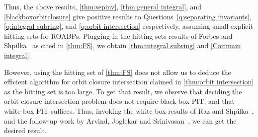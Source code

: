 \documentclass[letterpaper,11pt]{article}
\numberwithin{equation}{section}
\theoremstyle{plain}
\theoremstyle{remark}
\begin{document}
Thus, the above results, \autoref{thm:sepinv}, \autoref{thm:general integral}, and \autoref{blackboxorbitclosure} give positive results to Questions~\ref{q:separating invariants}, \ref{q:integral subring}, and \ref{q:orbit intersection} respectively, assuming small explicit hitting sets for ROABPs.  Plugging in the hitting sets results of Forbes and Shpilka~\cite{ForbesShpilka12a} as cited in \autoref{thm:FS}, we obtain \autoref{thm:integral subring} and \autoref{Cor:main integral}.

However, using the hitting set of \autoref{thm:FS} does not allow us to deduce the efficient algorithm for orbit closure intersection claimed in \autoref{thm:orbit intersection} as the hitting set is too large.  To get that result, we observe that deciding the orbit closure intersection problem does not require black-box PIT, and that white-box PIT suffices.  Thus, invoking the white-box results of Raz and Shpilka~\cite{RazShpilka05}, and the follow-up work by Arvind, Joglekar and Srinivasan~\cite{ArvindJS09}, we can get the desired result.
\end{document}
